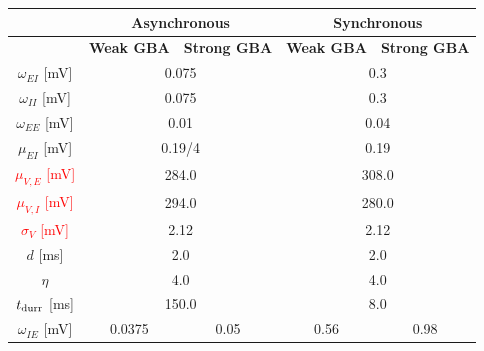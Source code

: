 \begin{table}[!ht]
\centering
\begin{tabular}{c|c|c|c|c|}
\cline{2-5}
\multicolumn{1}{l|}{}                                    & \multicolumn{2}{c|}{\textbf{Asynchronous}} &  \multicolumn{2}{c|}{\textbf{Synchronous}} \\ \hline 
\multicolumn{1}{|c|}{}                                   & \textbf{Weak GBA}   & \textbf{Strong GBA}  & \textbf{Weak GBA}  & \textbf{Strong GBA}  \\ \hline
\multicolumn{1}{|c|}{$\omega_{EI}$ {[}mV{]}}             & \multicolumn{2}{c|}{0.075}                 & \multicolumn{2}{c|}{0.3}                  \\ \hline
\multicolumn{1}{|c|}{$\omega_{II}$ {[}mV{]}}             & \multicolumn{2}{c|}{0.075}                 & \multicolumn{2}{c|}{0.3}                  \\ \hline
\multicolumn{1}{|c|}{$\omega_{EE}$ {[}mV{]}}             & \multicolumn{2}{c|}{0.01}                  & \multicolumn{2}{c|}{0.04}                 \\ \hline
\multicolumn{1}{|c|}{$\mu_{EI}$ {[}mV{]}}                & \multicolumn{2}{c|}{0.19/4}                & \multicolumn{2}{c|}{0.19}                 \\ \hline
\multicolumn{1}{|c|}{\textcolor{red}{$\mu_{V,E}$ {[}mV{]}}}               & \multicolumn{2}{c|}{284.0}                 & \multicolumn{2}{c|}{308.0}                \\ \hline
\multicolumn{1}{|c|}{\textcolor{red}{$\mu_{V,I}$ {[}mV{]}}}               & \multicolumn{2}{c|}{294.0}                 & \multicolumn{2}{c|}{280.0}                \\ \hline
\multicolumn{1}{|c|}{\textcolor{red}{$\sigma_V$ {[}mV{]}}}                & \multicolumn{2}{c|}{2.12}                  & \multicolumn{2}{c|}{2.12}                 \\ \hline
\multicolumn{1}{|c|}{$d$ {[}ms{]}}                       & \multicolumn{2}{c|}{2.0}                   & \multicolumn{2}{c|}{2.0}                  \\ \hline
\multicolumn{1}{|c|}{$\eta$}                             & \multicolumn{2}{c|}{4.0}                   & \multicolumn{2}{c|}{4.0}                  \\ \hline
\multicolumn{1}{|c|}{$t_{\rm durr} $ {[}ms{]}}           & \multicolumn{2}{c|}{150.0}                 & \multicolumn{2}{c|}{8.0}                  \\ \hline
\multicolumn{1}{|c|}{$\omega_{IE}$ {[}mV{]}}             & 0.0375              & 0.05                 & 0.56               & 0.98                 \\ \hline

\end{tabular}
\end{table}
